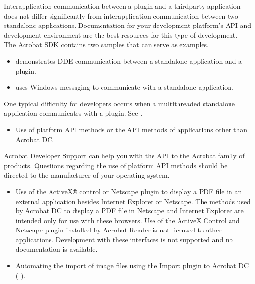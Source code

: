 \documentclass[letterpaper,12pt,english,openany,oneside]{sphinxmanual}
\begin{document}
Interapplication communication between a plug\sphinxhyphen{}in and a third\sphinxhyphen{}party application does not differ significantly from interapplication communication between two stand\sphinxhyphen{}alone applications. Documentation for your development platform’s API and development environment are the best resources for this type of development. The Acrobat SDK contains two samples that can serve as examples.
\begin{itemize}
\item {} 
 demonstrates DDE communication between a stand\sphinxhyphen{}alone application and a plug\sphinxhyphen{}in.

\item {} 
 uses Windows messaging to communicate with a stand\sphinxhyphen{}alone application.

\end{itemize}

One typical difficulty for developers occurs when a multithreaded stand\sphinxhyphen{}alone application communicates with a plug\sphinxhyphen{}in. See .
\begin{itemize}
\item {} 
Use of platform API methods or the API methods of applications other than Acrobat DC.

\end{itemize}

Acrobat Developer Support can help you with the API to the Acrobat family of products. Questions regarding the use of platform API methods should be directed to the manufacturer of your operating system.
\begin{itemize}
\item {} 
Use of the ActiveX® control or Netscape plug\sphinxhyphen{}in to display a PDF file in an external application besides Internet Explorer or Netscape. The methods used by Acrobat DC to display a PDF file in Netscape and Internet Explorer are intended only for use with these browsers. Use of the ActiveX Control and Netscape plug\sphinxhyphen{}in installed by Acrobat Reader is not licensed to other applications. Development with these interfaces is not supported and no documentation is available.

\item {} 
Automating the import of image files using the Import plug\sphinxhyphen{}in to Acrobat DC (  ).

\end{itemize}
\end{document}
